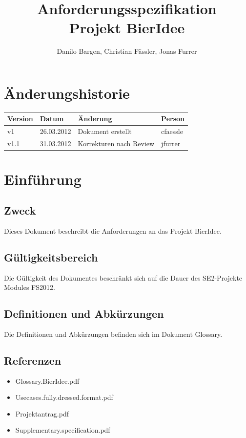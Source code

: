 \documentclass[10pt,a4paper]{scrartcl}
\author{Danilo Bargen, Christian Fässler, Jonas Furrer}
\title{Anforderungsspezifikation\\ Projekt BierIdee}
\begin{document}
\begin{titlepage}
	\maketitle
	\vspace{120mm}
	\thispagestyle{empty} %
\end{titlepage}

\tableofcontents
\newpage

\section{Änderungshistorie}
\begin{tabular}{p{}p{}p{}p{}}
\toprule
\textbf{Version} & \textbf{Datum} & \textbf{Änderung} & \textbf{Person} \\  
\midrule
v1 & 26.03.2012 & Dokument erstellt & cfaessle \\  
\hline 
v1.1 & 31.03.2012 & Korrekturen nach Review & jfurrer \\
\bottomrule
\end{tabular} 
\newpage


\section{Einführung}

\subsection{Zweck}
Dieses Dokument beschreibt die Anforderungen an das Projekt BierIdee.

\subsection{Gültigkeitsbereich}
Die Gültigkeit des Dokumentes beschränkt sich auf die Dauer des SE2-Projekte Modules FS2012.

\subsection{Definitionen und Abkürzungen}
Die Definitionen und Abkürzungen befinden sich im Dokument Glossary.

\subsection{Referenzen}
\begin{itemize}
\item Glossary.BierIdee.pdf
\item Usecases.fully.dressed.format.pdf
\item Projektantrag.pdf
\item Supplementary.specification.pdf
\end{itemize}
\end{document}
